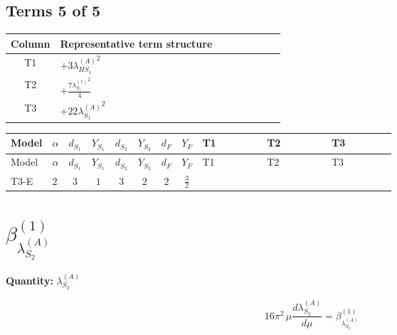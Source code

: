 \documentclass[8pt]{article}
\begin{document}
\begin{landscape}
\subsection*{Terms 5 of 5}
\begin{center}
\begin{tabular}{@{}c >{\raggedright\arraybackslash}p{0.82\linewidth}@{}}
\toprule
Column & Representative term structure \\
\midrule
T1 & \(\displaystyle +3 {\lambda_{HS_1}^{(A)}}^2\) \\
\midrule
T2 & \(\displaystyle +\frac{7 {\lambda_{S_1}^{(1)}}^2}{4}\) \\
\midrule
T3 & \(\displaystyle +22 {\lambda_{S_1}^{(A)}}^2\) \\
\midrule
\bottomrule
\end{tabular}
\end{center}
\smallskip
\tiny
\begin{longtable}{@{}llcccccc >{\raggedright\arraybackslash}p{0.21\linewidth} >{\raggedright\arraybackslash}p{0.21\linewidth} >{\raggedright\arraybackslash}p{0.21\linewidth}@{}}
\toprule
Model & $\alpha$ & $d_{S_1}$ & $Y_{S_1}$ & $d_{S_2}$ & $Y_{S_2}$ & $d_F$ & $Y_F$ & T1 & T2 & T3 \\
\midrule
\endfirsthead
\toprule
Model & $\alpha$ & $d_{S_1}$ & $Y_{S_1}$ & $d_{S_2}$ & $Y_{S_2}$ & $d_F$ & $Y_F$ & T1 & T2 & T3 \\
\midrule
\endhead
T3-E & $2$ & $3$ & $1$ & $3$ & $2$ & $2$ & $\frac{3}{2}$ & \scriptsize\adjustbox{max width=\linewidth}{$\begin{gathered} +3 {\lambda_{HS_1}^{(A)}}^2\end{gathered}$} & \scriptsize\adjustbox{max width=\linewidth}{$\begin{gathered} +\frac{7 {\lambda_{S_1}^{(1)}}^2}{4}\end{gathered}$} & \scriptsize\adjustbox{max width=\linewidth}{$\begin{gathered} +22 {\lambda_{S_1}^{(A)}}^2\end{gathered}$} \\
\midrule
\bottomrule
\end{longtable}
\clearpage
\section*{$\beta_{\lambda_{S_2}^{(A)}}^{(1)}$}
\noindent\textbf{Quantity: }$\lambda_{S_2}^{(A)}$\par\smallskip
\[16\pi^2\,\mu\frac{d \lambda_{S_2}^{(A)}}{d\mu}=\beta_{\lambda_{S_2}^{(A)}}^{(1)}\]

\end{landscape}
\end{document}
